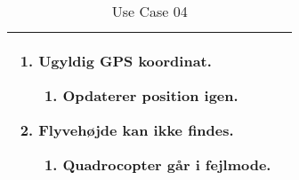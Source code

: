 \begin{table}[H]
\begin{tabular}{|l|p{10cm}|}
									\renewcommand{\labelenumi}{\Roman{enumi}:}
									\renewcommand{\labelenumii}{\alph{enumii})}
									\begin{enumerate}[topsep=0.0cm,leftmargin=0.5cm]
										\item Ugyldig GPS koordinat.
											\begin{enumerate}[topsep=0cm, leftmargin=1cm]
												\item Opdaterer position igen.
											\end{enumerate}
										\item Flyvehøjde kan ikke findes.
											\begin{enumerate}[topsep=0cm, leftmargin=1cm]
												\item Quadrocopter går i fejlmode.
											\end{enumerate}
									\end{enumerate} \\\hline	

\end{tabular}
\caption{Use Case 04}
\label{tab:UC04}
\end{table}